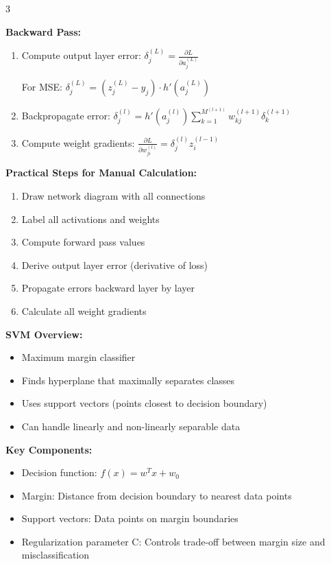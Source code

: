 \documentclass[10pt,landscape]{article}
\begin{document}
\begin{multicols}{3}
\begin{tcolorbox}[breakable, title=3.3 Backpropagation Computation, colback=neural]
\textbf{Backward Pass:}
\begin{enumerate}[leftmargin=*,noitemsep,topsep=0pt]
    \item Compute output layer error:
    $\delta^{(L)}_j = \frac{\partial L}{\partial a^{(L)}_j}$
    
    For MSE: $\delta^{(L)}_j = (z^{(L)}_j - y_j) \cdot h'(a^{(L)}_j)$
    
    \item Backpropagate error:
    $\delta^{(l)}_j = h'(a^{(l)}_j) \sum_{k=1}^{M^{(l+1)}} w^{(l+1)}_{kj} \delta^{(l+1)}_k$
    
    \item Compute weight gradients:
    $\frac{\partial L}{\partial w^{(l)}_{ji}} = \delta^{(l)}_j z^{(l-1)}_i$
\end{enumerate}

\textbf{Practical Steps for Manual Calculation:}
\begin{enumerate}[leftmargin=*,noitemsep,topsep=0pt]
    \item Draw network diagram with all connections
    \item Label all activations and weights
    \item Compute forward pass values
    \item Derive output layer error (derivative of loss)
    \item Propagate errors backward layer by layer
    \item Calculate all weight gradients
\end{enumerate}
\end{tcolorbox}

\begin{tcolorbox}[breakable, title=4. Support Vector Machines Concepts, colback=svm]
\textbf{SVM Overview:}
\begin{itemize}[leftmargin=*,noitemsep,topsep=0pt]
    \item Maximum margin classifier
    \item Finds hyperplane that maximally separates classes
    \item Uses support vectors (points closest to decision boundary)
    \item Can handle linearly and non-linearly separable data
\end{itemize}

\textbf{Key Components:}
\begin{itemize}[leftmargin=*,noitemsep,topsep=0pt]
    \item Decision function: $f(x) = w^Tx + w_0$
    \item Margin: Distance from decision boundary to nearest data points
    \item Support vectors: Data points on margin boundaries
    \item Regularization parameter C: Controls trade-off between margin size and misclassification
\end{itemize}


\end{tcolorbox}
\end{multicols}
\end{document}
